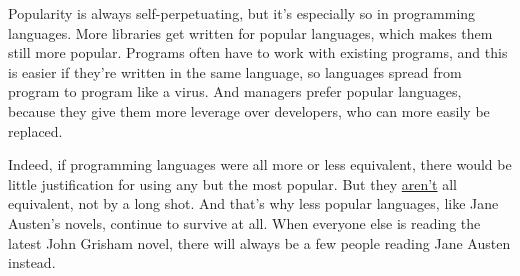 Popularity is always self-perpetuating, but it's especially so in
programming languages. More libraries get written for popular languages,
which makes them still more popular. Programs often have to work with
existing programs, and this is easier if they're written in the same
language, so languages spread from program to program like a virus. And
managers prefer popular languages, because they give them more leverage
over developers, who can more easily be replaced.

Indeed, if programming languages were all more or less equivalent, there
would be little justification for using any but the most popular. But
they \href{icad.html}{aren't} all equivalent, not by a long shot. And
that's why less popular languages, like Jane Austen's novels, continue
to survive at all. When everyone else is reading the latest John Grisham
novel, there will always be a few people reading Jane Austen instead.